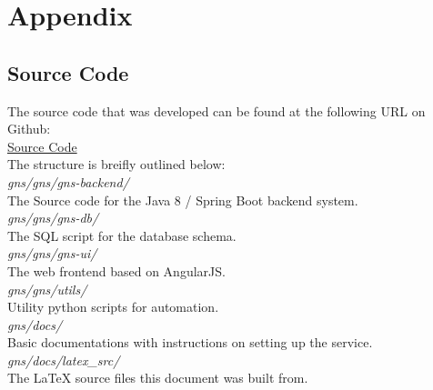 
\section{Appendix}

\subsection{Source Code}
The source code that was developed can be found at the following URL on Github:\\

\href{https://github.com/ralflorent/gns.git}{Source Code}\\

\noindent
The structure is breifly outlined below:\\

\noindent
\textit{gns/gns/gns-backend/}\\
The Source code for the Java 8 / Spring Boot backend system.\\

\noindent
\textit{gns/gns/gns-db/}\\
The SQL script for the database schema.\\

\noindent
\textit{gns/gns/gns-ui/}\\
The web frontend based on AngularJS.\\

\noindent
\textit{gns/gns/utils/}\\
Utility python scripts for automation.\\

\noindent
\textit{gns/docs/}\\
Basic documentations with instructions on setting up the service.\\

\noindent
\textit{gns/docs/latex\_src/}\\
The LaTeX source files this document was built from.\\